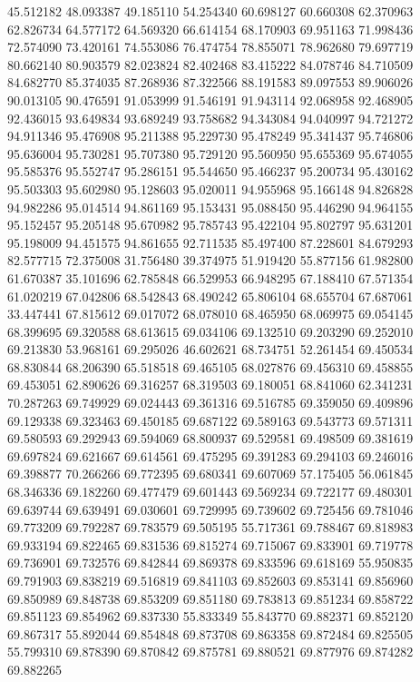 45.512182
48.093387
49.185110
54.254340
60.698127
60.660308
62.370963
62.826734
64.577172
64.569320
66.614154
68.170903
69.951163
71.998436
72.574090
73.420161
74.553086
76.474754
78.855071
78.962680
79.697719
80.662140
80.903579
82.023824
82.402468
83.415222
84.078746
84.710509
84.682770
85.374035
87.268936
87.322566
88.191583
89.097553
89.906026
90.013105
90.476591
91.053999
91.546191
91.943114
92.068958
92.468905
92.436015
93.649834
93.689249
93.758682
94.343084
94.040997
94.721272
94.911346
95.476908
95.211388
95.229730
95.478249
95.341437
95.746806
95.636004
95.730281
95.707380
95.729120
95.560950
95.655369
95.674055
95.585376
95.552747
95.286151
95.544650
95.466237
95.200734
95.430162
95.503303
95.602980
95.128603
95.020011
94.955968
95.166148
94.826828
94.982286
95.014514
94.861169
95.153431
95.088450
95.446290
94.964155
95.152457
95.205148
95.670982
95.785743
95.422104
95.802797
95.631201
95.198009
94.451575
94.861655
92.711535
85.497400
87.228601
84.679293
82.577715
72.375008
31.756480
39.374975
51.919420
55.877156
61.982800
61.670387
35.101696
62.785848
66.529953
66.948295
67.188410
67.571354
61.020219
67.042806
68.542843
68.490242
65.806104
68.655704
67.687061
33.447441
67.815612
69.017072
68.078010
68.465950
68.069975
69.054145
68.399695
69.320588
68.613615
69.034106
69.132510
69.203290
69.252010
69.213830
53.968161
69.295026
46.602621
68.734751
52.261454
69.450534
68.830844
68.206390
65.518518
69.465105
68.027876
69.456310
69.458855
69.453051
62.890626
69.316257
68.319503
69.180051
68.841060
62.341231
70.287263
69.749929
69.024443
69.361316
69.516785
69.359050
69.409896
69.129338
69.323463
69.450185
69.687122
69.589163
69.543773
69.571311
69.580593
69.292943
69.594069
68.800937
69.529581
69.498509
69.381619
69.697824
69.621667
69.614561
69.475295
69.391283
69.294103
69.246016
69.398877
70.266266
69.772395
69.680341
69.607069
57.175405
56.061845
68.346336
69.182260
69.477479
69.601443
69.569234
69.722177
69.480301
69.639744
69.639491
69.030601
69.729995
69.739602
69.725456
69.781046
69.773209
69.792287
69.783579
69.505195
55.717361
69.788467
69.818983
69.933194
69.822465
69.831536
69.815274
69.715067
69.833901
69.719778
69.736901
69.732576
69.842844
69.869378
69.833596
69.618169
55.950835
69.791903
69.838219
69.516819
69.841103
69.852603
69.853141
69.856960
69.850989
69.848738
69.853209
69.851180
69.783813
69.851234
69.858722
69.851123
69.854962
69.837330
55.833349
55.843770
69.882371
69.852120
69.867317
55.892044
69.854848
69.873708
69.863358
69.872484
69.825505
55.799310
69.878390
69.870842
69.875781
69.880521
69.877976
69.874282
69.882265
